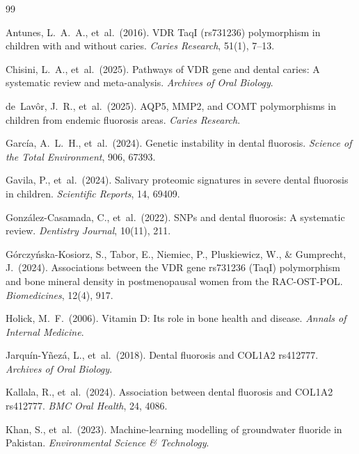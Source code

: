 \documentclass[12pt,a4paper]{article}
\begin{document}

\begin{thebibliography}{99}

Antunes, L.\ A.\ A., et~al.\ (2016).
VDR TaqI (rs731236) polymorphism in children with and without caries.
\textit{Caries Research}, 51(1), 7--13.

Chisini, L.\ A., et~al.\ (2025).
Pathways of VDR gene and dental caries: A systematic review and meta-analysis.
\textit{Archives of Oral Biology}.

de~Lavôr, J.\ R., et~al.\ (2025).
AQP5, MMP2, and COMT polymorphisms in children from endemic fluorosis areas.
\textit{Caries Research}.

García, A.\ L.\ H., et~al.\ (2024).
Genetic instability in dental fluorosis.
\textit{Science of the Total Environment}, 906, 67393.

Gavila, P., et~al.\ (2024).
Salivary proteomic signatures in severe dental fluorosis in children.
\textit{Scientific Reports}, 14, 69409.

González-Casamada, C., et~al.\ (2022).
SNPs and dental fluorosis: A systematic review.
\textit{Dentistry Journal}, 10(11), 211.

Górczyńska-Kosiorz, S., Tabor, E., Niemiec, P., Pluskiewicz, W., \& Gumprecht, J.\ (2024).
Associations between the VDR gene rs731236 (TaqI) polymorphism and bone mineral density in
postmenopausal women from the RAC-OST-POL.
\textit{Biomedicines}, 12(4), 917.

Holick, M.\ F.\ (2006).
Vitamin D: Its role in bone health and disease.
\textit{Annals of Internal Medicine}.

Jarquín-Yñezá, L., et~al.\ (2018).
Dental fluorosis and COL1A2 rs412777.
\textit{Archives of Oral Biology}.

Kallala, R., et~al.\ (2024).
Association between dental fluorosis and COL1A2 rs412777.
\textit{BMC Oral Health}, 24, 4086.

Khan, S., et~al.\ (2023).
Machine-learning modelling of groundwater fluoride in Pakistan.
\textit{Environmental Science \& Technology}.


\end{thebibliography}
\end{document}

